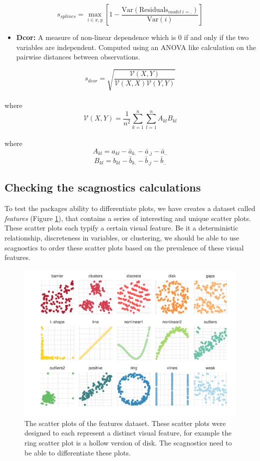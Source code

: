\[s_{splines}=\max_{i\in x,y}\left[ 1-\frac{\mbox{Var}(\mbox{Residuals}_{model~i=.})}{\mbox{Var}(i)}\right] \]

\begin{itemize}
\tightlist
\item
  \textbf{Dcor:} A measure of non-linear dependence which is 0 if and
  only if the two variables are independent. Computed using an ANOVA
  like calculation on the pairwise distances between observations.
\end{itemize}

\[s_{dcor}= \sqrt{\frac{\mathcal{V}(X,Y)}{\mathcal{V}(X,X)\mathcal{V}(Y,Y)}}\]\\
where \[\mathcal{V}
(X,Y)=\frac{1}{n^2}\sum_{k=1}^n\sum_{l=1}^nA_{kl}B_{kl}\]\\
where \[A_{kl}=a_{kl}-\bar{a}_{k.}-\bar{a}_{.j}-\bar{a}_{..}\]
\[B_{kl}=b_{kl}-\bar{b}_{k.}-\bar{b}_{.j}-\bar{b}_{..}\]

\hypertarget{checking-the-scagnostics-calculations}{%
\subsection{Checking the scagnostics
calculations}\label{checking-the-scagnostics-calculations}}

To test the packages ability to differentiate plots, we have creates a
dataset called \emph{features} (Figure \ref{fig:features-plot}), that
contains a series of interesting and unique scatter plots. These scatter
plots each typify a certain visual feature. Be it a deterministic
relationship, discreteness in variables, or clustering, we should be
able to use scagnostics to order these scatter plots based on the
prevalence of these visual features.

\begin{Schunk}
\begin{figure}
\includegraphics[width=1\linewidth]{mason-lee-laa-cook_files/figure-latex/features-plot-1} \caption[The scatter plots of the features dataset]{The scatter plots of the features dataset. These scatter plots were designed to each represent a distinct visual feature, for example the ring scatter plot is a hollow version of disk. The scagnostics need to be able to differentiate these plots.}\label{fig:features-plot}
\end{figure}
\end{Schunk}

